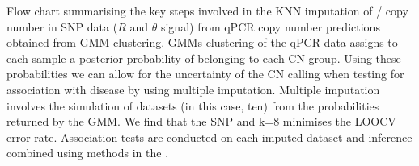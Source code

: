 {Flow chart summarising the key steps involved in the KNN imputation of / copy number in SNP data
($R$ and $\theta$ signal) from qPCR copy number predictions obtained from GMM clustering.}
{
\Glspl{GMM} clustering of the qPCR data assigns to each sample a posterior probability of belonging to each \gls{CN} group.
Using these probabilities we can allow for the uncertainty of the CN calling when testing for association with disease by using multiple imputation.
Multiple imputation involves the simulation of datasets (in this case, ten) from the probabilities returned by the GMM.
We find that the SNP  and k=8 minimises the \Gls{LOOCV} error rate.  
Association tests are conducted on each imputed dataset and inference combined using methods in the .
}



%
%


